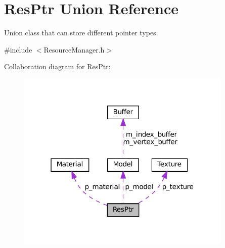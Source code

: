 \hypertarget{unionResPtr}{}\section{Res\+Ptr Union Reference}
\label{unionResPtr}


Union class that can store different pointer types.  




{\ttfamily \#include $<$Resource\+Manager.\+h$>$}



Collaboration diagram for Res\+Ptr\+:
\nopagebreak
\begin{figure}[H]
\begin{center}
\leavevmode
\includegraphics[width=292pt]{unionResPtr__coll__graph}
\end{center}
\end{figure}
